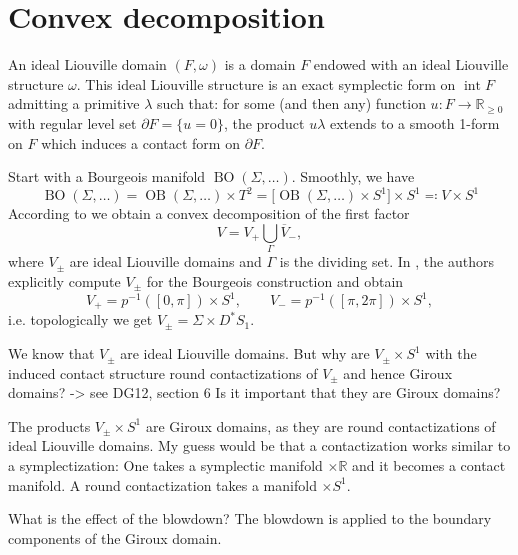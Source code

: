 \section*{Convex decomposition}

\begin{definition} \cite[Definition 1]{Giroux20}
An ideal Liouville domain
$(F, \omega)$ is a domain $F$ endowed with an ideal Liouville structure $\omega$. This
ideal Liouville structure is an exact symplectic form on $\operatorname{int} F$
admitting a primitive $\lambda$ such that: for some (and then any) function 
$u \colon F \to \mathbb R_{\geq 0}$  with regular level set $\partial F = \{u = 0\}$,
the product $u\lambda$ extends to a smooth 1-form on $F$ which 
induces a contact form on $\partial F$.
\end{definition}

Start with a Bourgeois manifold $\operatorname{BO}(\Sigma,\dots)$.
Smoothly, we have
\[
    \operatorname{BO}(\Sigma,\dots) = \operatorname{OB}(\Sigma, \dots) \times T^2 
    = \big[\operatorname{OB}(\Sigma, \dots) \times S^1\big] \times S^1 
    \eqqcolon V \times S^1
\]
According to \cite[Section 6]{DG12} we obtain a convex decomposition of the first factor
\[
    V = V_+ \bigcup_\Gamma \overline{V}_-,
\]
where $V_\pm$ are ideal Liouville domains and $\Gamma$ is the dividing set.
In \cite[Section 5.3]{DG12}, the authors explicitly compute $V_\pm$ for the Bourgeois
construction and obtain %
\[
    V_+ = p^{-1}([0, \pi]) \times S^1, \qquad V_- = p^{-1}([\pi, 2\pi]) \times S^1,
\]
i.e. topologically we get $V_\pm = \Sigma \times D^*S_1$.

We know that $V_\pm$ are ideal Liouville domains.
But why are $V_\pm \times S^1$ with the induced contact structure
round contactizations of $V_\pm$ and hence Giroux domains? -> see DG12, section 6
Is it important that they are Giroux domains?

The products $V_\pm \times S^1$ are Giroux domains, 
    as they are round contactizations of ideal Liouville domains.
    My guess would be that a contactization works similar to a symplectization:
    One takes a symplectic manifold $\times \mathbb R$ and it becomes a contact manifold.
    A round contactization takes a manifold $\times S^1$.

What is the effect of the blowdown?
The blowdown is applied to the boundary components of the Giroux domain.
